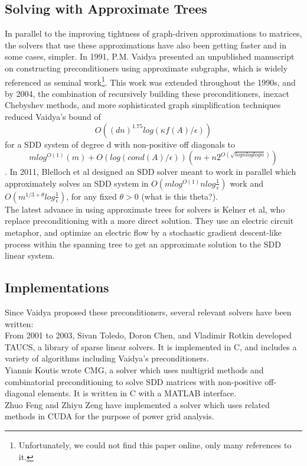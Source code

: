 \documentclass{article}
\begin{document}
\subsection*{Solving with Approximate Trees}
In parallel to the improving tightness of graph-driven approximations to matrices, the solvers that use these approximations have also been getting faster and in some cases, simpler.
In 1991, P.M. Vaidya presented an unpublished manuscript\cite{vaidya} on constructing preconditioners using approximate subgraphs, which is widely referenced as seminal work\footnote{Unfortunately, we could not find this paper online, only many references to it.}.  This work was extended throughout the 1990s, and by 2004, the combination of recursively building these preconditioners, inexact Chebyshev methods, and more sophisticated graph simplification techniques reduced Vaidya's bound of $$O((dn)^{1.75}log(κf(A)/\epsilon))$$ for a SDD system of degree d with non-positive off diagonals to $$mlog^{O(1)}(m)+O(log(cond(A)/\epsilon))(m+n2^{O(\sqrt{lognlog logn})})$$\cite{spielman:nearly-linear-sparse}.
In 2011, Blelloch et al designed an SDD solver meant to work in parallel which approximately solves an SDD system in 
$O(mlog^{O(1)}nlog\frac{1}{\epsilon})$ work and $O(m^{1/3 + \theta}log\frac{1}{\epsilon})$, for any fixed $\theta>0$ (what is this theta?).\\


The latest advance in using approximate trees for solvers is Kelner et al\cite{comb-sdd}, who replace preconditioning with a more direct solution.  They use an electric circuit metaphor, and optimize an electric flow by a stochastic gradient descent-like process within the spanning tree to get an approximate solution to the SDD linear system.  

\subsection*{Implementations}
Since Vaidya proposed these preconditioners, several relevant solvers have been written:\\
From 2001 to 2003, Sivan Toledo, Doron Chen, and Vladimir Rotkin developed TAUCS\cite{taucs}, a library of sparse linear solvers. 
It is implemented in C, and includes a variety of algorithms including Vaidya's preconditioners.\\
Yiannis Koutis wrote CMG\cite{CMG}, a solver which uses multigrid methods and combinatorial preconditioning to solve SDD matrices with non-positive off-diagonal elements.  It is written in C with a MATLAB interface.\\
Zhuo Feng and Zhiyu Zeng have implemented a solver which uses related methods in CUDA for the purpose of power grid analysis.\\
\end{document}
